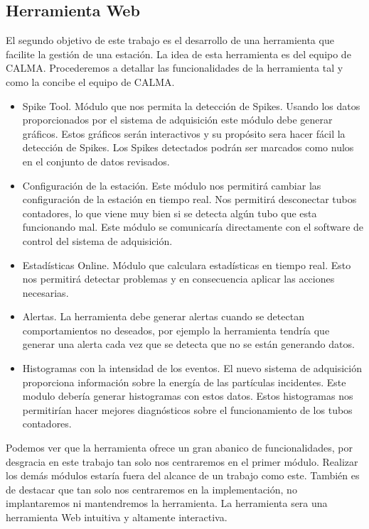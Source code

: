 	\subsection{Herramienta Web}
		El segundo objetivo de este trabajo es el desarrollo de una herramienta que facilite la gestión de una estación. La idea de esta
		herramienta es del equipo de CALMA. Procederemos a detallar las funcionalidades de la herramienta tal y como la concibe el equipo de
		CALMA.
		\begin{itemize}
	         	\item	Spike Tool. Módulo que nos permita la detección de Spikes. Usando los datos proporcionados por el sistema de
			  	adquisición este módulo debe generar gráficos. Estos gráficos serán interactivos y su propósito sera hacer fácil la
				detección de Spikes. Los Spikes detectados podrán ser marcados como nulos en el conjunto de datos revisados. 
			\item 	Configuración de la estación. Este módulo nos permitirá cambiar las configuración de la estación en tiempo real. Nos
			  	permitirá desconectar tubos contadores, lo que viene muy bien si se detecta algún tubo que esta funcionando mal. Este
				módulo se comunicaría directamente con el software de control del sistema de adquisición. 
			\item 	Estadísticas Online. Módulo que calculara estadísticas en tiempo real. Esto nos permitirá detectar problemas y en
			  	consecuencia aplicar las acciones necesarias. 
			\item	Alertas. La herramienta debe generar alertas cuando se detectan comportamientos no deseados, por ejemplo la
			  	herramienta tendría que generar una alerta cada vez que se detecta que no se están generando datos.
			\item 	Histogramas con la intensidad de los eventos. El nuevo sistema de adquisición proporciona información sobre la energía
			  	de las partículas incidentes. Este modulo debería generar histogramas con estos datos. Estos histogramas nos
				permitirían hacer mejores diagnósticos sobre el funcionamiento de los tubos contadores. 
		\end{itemize}
		Podemos ver que la herramienta ofrece un gran abanico de funcionalidades, por desgracia en este trabajo tan solo nos centraremos en el
		primer módulo. Realizar los demás módulos estaría fuera del alcance de un trabajo como este. También es de destacar que tan solo
		nos centraremos en la implementación, no implantaremos ni mantendremos la herramienta. La herramienta sera una herramienta Web 
		intuitiva y altamente interactiva. 
		


